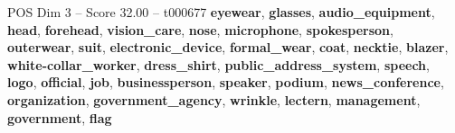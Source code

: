 \begin{textsample}{POS Dim 3 – Score 32.00 – t000677}  \label{ex:f3_pos_010}
\textbf{eyewear}, \textbf{glasses}, \textbf{audio\_equipment}, \textbf{head}, \textbf{forehead}, \textbf{vision\_care}, \textbf{nose}, \textbf{microphone}, \textbf{spokesperson}, \textbf{outerwear}, \textbf{suit}, \textbf{electronic\_device}, \textbf{formal\_wear}, \textbf{coat}, \textbf{necktie}, \textbf{blazer}, \textbf{white-collar\_worker}, \textbf{dress\_shirt}, \textbf{public\_address\_system}, \textbf{speech}, \textbf{logo}, \textbf{official}, \textbf{job}, \textbf{businessperson}, \textbf{speaker}, \textbf{podium}, \textbf{news\_conference}, \textbf{organization}, \textbf{government\_agency}, \textbf{wrinkle}, \textbf{lectern}, \textbf{management}, \textbf{government}, \textbf{flag}

\end{textsample}
